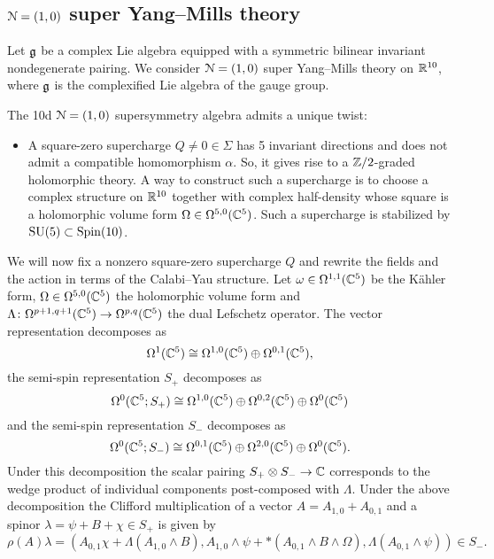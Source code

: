 \documentclass[10pt, oneside]{article}
\begin{document}
\subsection{$\mathcal N=(1, 0)$ super Yang--Mills theory}

Let $\mathfrak g$ be a complex Lie algebra equipped with a symmetric bilinear invariant nondegenerate pairing. We consider $\mathcal N=(1, 0)$ super Yang--Mills theory on $\mathbb R^{10}$, where $\mathfrak g$ is the complexified Lie algebra of the gauge group.

The 10d $\mathcal N=(1, 0)$ supersymmetry algebra admits a unique twist:
\begin{itemize}
\item A square-zero supercharge $Q\neq 0\in\Sigma$ has 5 invariant directions and does not admit a compatible homomorphism $\alpha$. So, it gives rise to a $\mathbb Z/2$-graded holomorphic theory. A way to construct such a supercharge is to choose a complex structure on $\mathbb R^{10}$ together with complex half-density whose square is a holomorphic volume form $\Omega\in\Omega^{5, 0}(\mathbb C^5)$. Such a supercharge is stabilized by $\mathrm{SU}(5)\subset \mathrm{Spin}(10)$.
\end{itemize}

We will now fix a nonzero square-zero supercharge $Q$ and rewrite the fields and the action in terms of the Calabi--Yau structure. Let $\omega\in\Omega^{1, 1}(\mathbb C^5)$ be the K\"ahler form, $\Omega\in\Omega^{5, 0}(\mathbb C^5)$ the holomorphic volume form and $\Lambda\colon \Omega^{p+1, q+1}(\mathbb C^5)\rightarrow \Omega^{p, q}(\mathbb C^5)$ the dual Lefschetz operator. The vector representation decomposes as
\[\Omega^1(\mathbb C^5)\cong \Omega^{1, 0}(\mathbb C^5)\oplus \Omega^{0, 1}(\mathbb C^5),\]
the semi-spin representation $S_+$ decomposes as
\[\Omega^0(\mathbb C^5; S_+)\cong \Omega^{1, 0}(\mathbb C^5)\oplus \Omega^{0, 2}(\mathbb C^5)\oplus \Omega^0(\mathbb C^5)\]
and the semi-spin representation $S_-$ decomposes as
\[\Omega^0(\mathbb C^5; S_-)\cong \Omega^{0, 1}(\mathbb C^5)\oplus \Omega^{2, 0}(\mathbb C^5)\oplus \Omega^0(\mathbb C^5).\]
Under this decomposition the scalar pairing $S_+\otimes S_-\rightarrow \mathbb C$ corresponds to the wedge product of individual components post-composed with $\Lambda$. Under the above decomposition the Clifford multiplication of a vector $A = A_{1, 0} + A_{0, 1}$ and a spinor $\lambda = \psi + B + \chi\in S_+$ is given by
\[\rho(A)\lambda = (A_{0, 1}\chi + \Lambda(A_{1, 0}\wedge B), A_{1, 0}\wedge \psi + \ast(A_{0, 1}\wedge B\wedge\Omega), \Lambda(A_{0, 1}\wedge \psi))\in S_-.\]

\vspace{-10pt}
\end{document}
